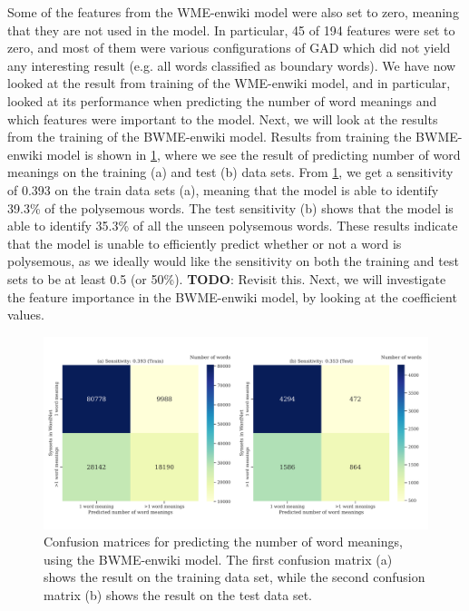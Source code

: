 Some of the features from the WME-enwiki model were also set to zero, meaning that they are not used in the model. In particular, 45 of 194 features were set to zero, and most of them were various configurations of GAD which did not yield any interesting result (e.g. all words classified as boundary words). We have now looked at the result from training of the WME-enwiki model, and in particular, looked at its performance when predicting the number of word meanings and which features were important to the model. Next, we will look at the results from the training of the BWME-enwiki model. Results from training the BWME-enwiki model is shown in \cref{fig:bwme-enwiki-confusion-matrices}, where we see the result of predicting number of word meanings on the training (a) and test (b) data sets. From \cref{fig:bwme-enwiki-confusion-matrices}, we get a sensitivity of 0.393 on the train data sets (a), meaning that the model is able to identify 39.3\% of the polysemous words. The test sensitivity (b) shows that the model is able to identify 35.3\% of all the unseen polysemous words. These results indicate that the model is unable to efficiently predict whether or not a word is polysemous, as we ideally would like the sensitivity on both the training and test sets to be at least 0.5 (or 50\%). \textbf{TODO}: Revisit this. Next, we will investigate the feature importance in the BWME-enwiki model, by looking at the coefficient values.
\begin{figure}[H]
    \centering
    \includegraphics[width=\textwidth]{thesis/figures/bwme-enwiki-confusion-matrices.pdf}
    \caption{Confusion matrices for predicting the number of word meanings, using the BWME-enwiki model. The first confusion matrix (a) shows the result on the training data set, while the second confusion matrix (b) shows the result on the test data set.}
    \label{fig:bwme-enwiki-confusion-matrices}
\end{figure}


